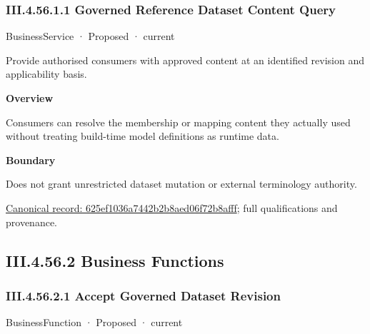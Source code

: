 \subsubsection*{III.4.56.1.1 Governed Reference Dataset Content Query}
\label{navigation:III.4.56.1.1}

\label{element:625ef1036a7442b2b8aed06f72b8afff}
{\small BusinessService · Proposed · current}\par

Provide authorised consumers with approved content at an identified revision and applicability basis.



\textbf{Overview}



Consumers can resolve the membership or mapping content they actually used without treating build-time model definitions as runtime data.



\textbf{Boundary}



Does not grant unrestricted dataset mutation or external terminology authority.


{\footnotesize \href{../../../../continuum/business/business-service/625ef1036a7442b2b8aed06f72b8afff.md}{Canonical record: 625ef1036a7442b2b8aed06f72b8afff}; full qualifications and provenance.}\par
\subsection*{III.4.56.2 Business Functions}
\label{navigation:III.4.56.2}

\subsubsection*{III.4.56.2.1 Accept Governed Dataset Revision}
\label{navigation:III.4.56.2.1}

\label{element:96c1c089e7f2443dbd3ad5beab6a3011}
{\small BusinessFunction · Proposed · current}\par

